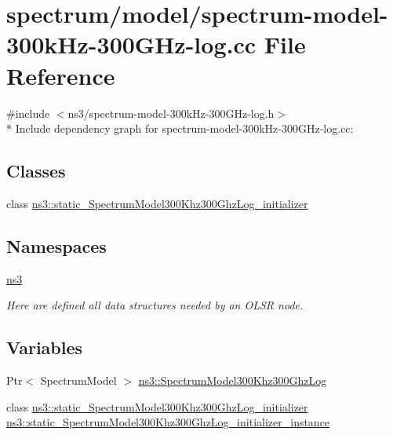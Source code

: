 \hypertarget{spectrum-model-300kHz-300GHz-log_8cc}{}\section{spectrum/model/spectrum-\/model-\/300k\+Hz-\/300\+G\+Hz-\/log.cc File Reference}
\label{spectrum-model-300kHz-300GHz-log_8cc}
{\ttfamily \#include $<$ns3/spectrum-\/model-\/300k\+Hz-\/300\+G\+Hz-\/log.\+h$>$}\\*
Include dependency graph for spectrum-\/model-\/300k\+Hz-\/300\+G\+Hz-\/log.cc\+:
\subsection*{Classes}
\begin{DoxyCompactItemize}
\item 
class \hyperlink{classns3_1_1static__SpectrumModel300Khz300GhzLog__initializer}{ns3\+::static\+\_\+\+Spectrum\+Model300\+Khz300\+Ghz\+Log\+\_\+initializer}
\end{DoxyCompactItemize}
\subsection*{Namespaces}
\begin{DoxyCompactItemize}
\item 
 \hyperlink{namespacens3}{ns3}
\begin{DoxyCompactList}\small\item\em Here are defined all data structures needed by an O\+L\+SR node. \end{DoxyCompactList}\end{DoxyCompactItemize}
\subsection*{Variables}
\begin{DoxyCompactItemize}
\item 
Ptr$<$ Spectrum\+Model $>$ \hyperlink{namespacens3_a5441325fd5ee50b45387f44f4d0d7ce9}{ns3\+::\+Spectrum\+Model300\+Khz300\+Ghz\+Log}
\item 
class \hyperlink{classns3_1_1static__SpectrumModel300Khz300GhzLog__initializer}{ns3\+::static\+\_\+\+Spectrum\+Model300\+Khz300\+Ghz\+Log\+\_\+initializer} \hyperlink{namespacens3_a60a09efc8af0d86a95ccda0774ffc915}{ns3\+::static\+\_\+\+Spectrum\+Model300\+Khz300\+Ghz\+Log\+\_\+initializer\+\_\+instance}
\end{DoxyCompactItemize}
